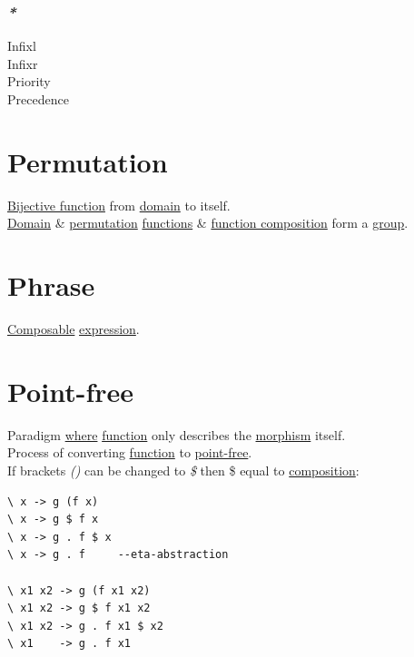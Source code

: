 \documentclass[a4paper,14pt,oneside]{book}
\begin{document}
\subsection{\emph{*}}
\label{sec:org71b780e}

\label{org088e702}Infixl\\
\label{org86a7c8b}Infixr\\
\label{orgd914628}Priority\\
\label{orgc9c28a3}Precedence\\

\chapter{\label{org3052cf2}Permutation}
\label{sec:org3f813ef}
\hyperref[org6a1e67d]{Bijective function} from \hyperref[orge94fc58]{domain} to itself.\\

\hyperref[orge94fc58]{Domain} \& \hyperref[org3052cf2]{permutation} \hyperref[org2d0eb2e]{functions} \& \hyperref[orgfdd9b21]{function composition} form a \hyperref[orgf31bec8]{group}.\\

\chapter{\label{org3f47f22}Phrase}
\label{sec:org909369a}
\hyperref[orgd3e1ce2]{Composable} \hyperref[org3ea9088]{expression}.\\

\chapter{\label{org5af0f30}Point-free}
\label{sec:orge07dbed}
Paradigm \hyperref[org1a56575]{where} \hyperref[orge00b05b]{function} only describes the \hyperref[org5a7c2d8]{morphism} itself.\\

Process of converting \hyperref[orge00b05b]{function} to \hyperref[org5af0f30]{point-free}.\\
If brackets \emph{()} can be changed to \emph{\$} then \$ equal to \hyperref[orgcf7d368]{composition}:\\
\begin{verbatim}
\ x -> g (f x)
\ x -> g $ f x
\ x -> g . f $ x
\ x -> g . f     --eta-abstraction

\ x1 x2 -> g (f x1 x2)
\ x1 x2 -> g $ f x1 x2
\ x1 x2 -> g . f x1 $ x2
\ x1    -> g . f x1
\end{verbatim}
\end{document}
